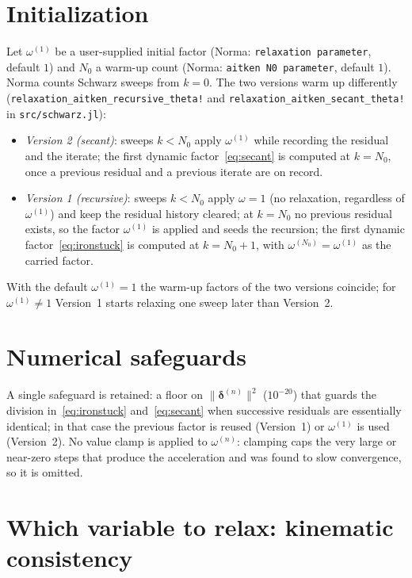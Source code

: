 \documentclass[11pt]{article}
\begin{document}
\section{Initialization}
\label{sec:init}

Let $\omega^{(1)}$ be a user-supplied initial factor (Norma:
\texttt{relaxation parameter}, default $1$) and $N_0$ a warm-up count (Norma:
\texttt{aitken N0 parameter}, default $1$). Norma counts Schwarz sweeps from
$k = 0$. The two versions warm up differently
(\texttt{relaxation\_aitken\_recursive\_theta!} and
\texttt{relaxation\_aitken\_secant\_theta!} in \texttt{src/schwarz.jl}):

\begin{itemize}
\item \emph{Version 2 (secant)}: sweeps $k < N_0$ apply $\omega^{(1)}$
while recording the residual and the iterate; the first dynamic
factor~\eqref{eq:secant} is computed at $k = N_0$, once a previous
residual and a previous iterate are on record.
\item \emph{Version 1 (recursive)}: sweeps $k < N_0$ apply $\omega = 1$
(no relaxation, regardless of $\omega^{(1)}$) and keep the residual
history cleared; at $k = N_0$ no previous residual exists, so the factor
$\omega^{(1)}$ is applied and seeds the recursion; the first dynamic
factor~\eqref{eq:ironstuck} is computed at $k = N_0 + 1$, with
$\omega^{(N_0)} = \omega^{(1)}$ as the carried factor.
\end{itemize}

With the default $\omega^{(1)} = 1$ the warm-up factors of the two
versions coincide; for $\omega^{(1)} \ne 1$ Version~1 starts relaxing one
sweep later than Version~2.

\section{Numerical safeguards}

A single safeguard is retained: a floor on
$\lVert\bm{\delta}^{(n)}\rVert^{2}$ ($10^{-20}$) that guards the division
in~\eqref{eq:ironstuck} and~\eqref{eq:secant} when successive residuals are
essentially identical; in that case the previous factor is reused (Version~1)
or $\omega^{(1)}$ is used (Version~2). No value clamp is applied to
$\omega^{(n)}$: clamping caps the very large or near-zero steps that produce
the acceleration and was found to slow convergence, so it is omitted.

\section{Which variable to relax: kinematic consistency}
\label{sec:fields}
\end{document}
